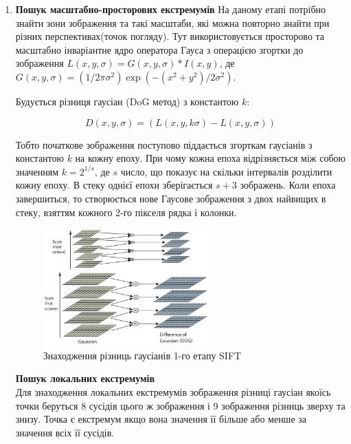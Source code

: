 \begin{enumerate}
    \item \textbf{Пошук масштабно-просторових екстремумів}
          На даному етапі потрібно знайти зони зображення та такі масштаби, які можна повторно
          знайти при різних перспективах(точок погляду). Тут використовується просторово та
          масштабно інваріантне ядро оператора Гауса з операцією згортки
          до зображення $L(x,y,\sigma) = G(x,y,\sigma) \ast I(x,y)$,
          де $G(x,y,\sigma) = (1/2\pi\sigma^2)\exp({-(x^2+y^2)/2\sigma^2})$.


          Будується різниця гаусіан (DoG метод) з константою $k$:

          \begin{equation}
              D(x,y,\sigma) = (L(x,y,k\sigma) - L(x,y,\sigma))
          \end{equation}

          Тобто початкове зображення поступово піддається згорткам гаусіанів з константою
          $k$ на кожну епоху. При чому кожна епоха відрізняється між собою значенням $k = 2^{1/s}$,
          де $s$ число, що показує на скільки інтервалів розділити кожну епоху.
          В стеку однієї епохи зберігається $s+3$ зображень. Коли епоха завершиться, то
          створюється нове Гаусове зображення з двох найвищих в стеку,
          взяттям кожного 2-го пікселя рядка і колонки.

          \begin{figure}[H]
              \centering
              \includegraphics[width=0.6\textwidth]{images/sift1}
              \caption{Знаходження різниць гаусіанів 1-го етапу SIFT}
              \label{fig:swift1}
          \end{figure}

          \subitem \textbf{Пошук локальних екстремумів} \\
          Для знаходження локальних екстремумів зображення різниці гаусіан
          якоїсь точки беруться 8 сусідів цього ж зображення і 9 зображення різниць
          зверху та знизу. Точка є екстремум якщо вона значення її більше або менше за
          значення всіх її сусідів.


\end{enumerate}
